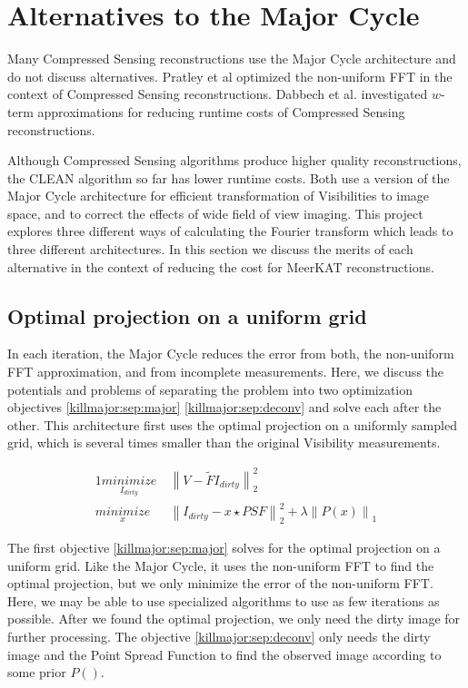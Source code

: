 \section{Alternatives to the Major Cycle}\label{killmajor}
Many Compressed Sensing reconstructions use the Major Cycle architecture\cite{girard2015sparse, dabbech2018cygnus, mcewen2011compressed, pratley2018fast}  and do not discuss alternatives. Pratley et al\cite{pratley2017robust} optimized the non-uniform FFT in the context of Compressed Sensing reconstructions. Dabbech et al.\cite{dabbech2017wEffect} investigated $w$-term approximations for reducing runtime costs of Compressed Sensing reconstructions.

Although Compressed Sensing algorithms produce higher quality reconstructions, the CLEAN algorithm so far has lower runtime costs. Both use a version of the Major Cycle architecture for efficient transformation of Visibilities to image space, and to correct the effects of wide field of view imaging. This project explores three different ways of calculating the Fourier transform which leads to three different architectures. In this section we discuss the merits of each alternative in the context of reducing the cost for MeerKAT reconstructions.

\subsection{Optimal projection on a uniform grid}
In each iteration, the Major Cycle reduces the error from both, the non-uniform FFT approximation, and from incomplete measurements. Here, we discuss the potentials and problems of separating the problem into two optimization objectives \eqref{killmajor:sep:major} \eqref{killmajor:sep:deconv} and solve each after the other. This architecture first uses the optimal projection on a uniformly sampled grid, which is several times smaller than the original Visibility measurements.

\begin{alignat}{1}
\underset{I_{dirty}}{minimize} \:& \left \|  V - \tilde{F}I_{dirty} \right \|_2^2\label{killmajor:sep:major}\\
\underset{x}{minimize} \:& \left \| I_{dirty} - x \star PSF \right \|_2^2 + \lambda \left \| P(x) \right \|_1 \label{killmajor:sep:deconv}
\end{alignat}


The first objective \eqref{killmajor:sep:major} solves for the optimal projection on a uniform grid. Like the Major Cycle, it uses the non-uniform FFT to find the optimal projection, but we only minimize the error of the non-uniform FFT. Here, we may be able to use specialized algorithms to use as few iterations as possible. After we found the optimal projection, we only need the dirty image for further processing. The objective \eqref{killmajor:sep:deconv} only needs the dirty image and the Point Spread Function to find the observed image according to some prior $P()$.


